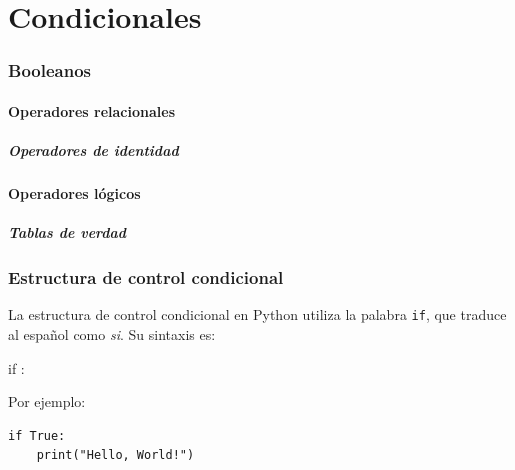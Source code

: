 \part{Condicionales}



\section{Booleanos}

\subsection{Operadores relacionales}


\subsubsection{Operadores de identidad}


\subsection{Operadores lógicos}


\subsubsection{Tablas de verdad}


\section{Estructura de control condicional}

La estructura de control condicional en Python utiliza la palabra \texttt{if}, que traduce al español como \textit{si}. Su sintaxis es:
\begin{sintaxis}
if :\\
\phantom{xxxx}
\end{sintaxis}
Por ejemplo:
\begin{verbatim}
if True:
    print("Hello, World!")
\end{verbatim}

